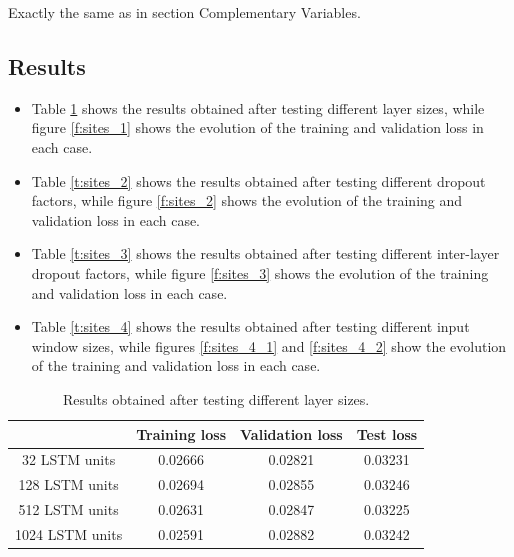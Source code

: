 \documentclass[]{article}
\begin{document}
	Exactly the same as in section Complementary Variables.
	
	\subsection{Results}
	
	\begin{itemize}
		\item Table \ref{t:sites_1} shows the results obtained after testing different layer sizes, while figure \ref{f:sites_1} shows the evolution of the training and validation loss in each case.
		
		\item Table \ref{t:sites_2} shows the results obtained after testing different dropout factors, while figure \ref{f:sites_2} shows the evolution of the training and validation loss in each case.
		
		\item Table \ref{t:sites_3} shows the results obtained after testing different inter-layer dropout factors, while figure \ref{f:sites_3} shows the evolution of the training and validation loss in each case.
		
		\item Table \ref{t:sites_4} shows the results obtained after testing different input window sizes, while figures \ref{f:sites_4_1} and \ref{f:sites_4_2} show the evolution of the training and validation loss in each case.
	\end{itemize}
	
	\begin{table}[H]
		\centering
		\begin{tabular}{@{}cccc@{}}
			\toprule
			& Training loss & Validation loss & Test loss \\ \midrule
			32 LSTM units   & 0.02666       & 0.02821         & 0.03231   \\
			128 LSTM units  & 0.02694       & 0.02855         & 0.03246   \\
			512 LSTM units  & 0.02631       & 0.02847         & 0.03225   \\
			1024 LSTM units & 0.02591       & 0.02882         & 0.03242   \\ \bottomrule
		\end{tabular}
		\caption{Results obtained after testing different layer sizes.}
		\label{t:sites_1}
	\end{table}
	
\end{document}

